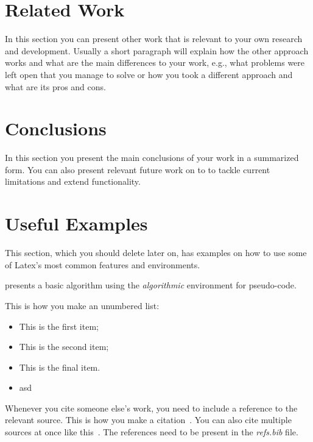 \documentclass[sigconf,balance,nonacm,authordraft]{acmart}
\begin{document}
\section{Related Work}
\label{sec:rel}
In this section you can present other work that is relevant to your own research and development. Usually a short paragraph will explain how the other approach works and what are the main differences to your work, e.g., what problems were left open that you manage to solve or how you took a different approach and what are its pros and cons.

\section{Conclusions}
\label{sec:conclusions}
In this section you present the main conclusions of your work in a summarized form. You can also present relevant future work on to to tackle current limitations and extend functionality.

\section{Useful Examples}
\label{sec:examples}
This section, which you should delete later on, has examples on how to use some of Latex's most common features and environments.



 presents a basic algorithm using the \textit{algorithmic} environment for pseudo-code.

This is how you make an unumbered list:
\begin{itemize}
    \item This is the first item;
    \item This is the second item;
    \item This is the final item.
    \item asd
\end{itemize}

Whenever you cite someone else's work, you need to include a reference to the relevant source. This is how you make a citation~\cite{Michie1968}. You can also cite multiple sources at once like this~\cite{Strachey2000,Connors2000}. The references need to be present in the \textit{refs.bib} file.
\end{document}
